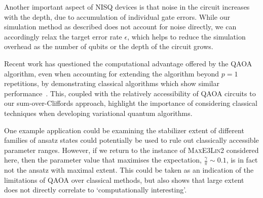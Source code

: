 Another important aspect of NISQ devices is that noise in the circuit increases with the depth, due to accumulation of individual gate errors. While our simulation method as described does not account for noise directly, we can accordingly relax the target error rate $\epsilon$, which helps to reduce the simulation overhead as the number of qubits or the depth of the circuit grows.\par
Recent work has questioned the computational advantage offered by the QAOA algorithm, even when accounting for extending the algorithm beyond $p=1$ repetitions, by demonstrating classical algorithms which show similar performance~\cite{Hastings2019}. This, coupled with the relatively accessibility of QAOA circuits to our sum-over-Cliffords approach, highlight the importance of considering classical techniques when developing variational quantum algorithms.\par
One example application could be examining the stabilizer extent of different families of ansatz states could potentially be used to rule out classically accessible parameter ranges. However, if we return to the instance of \textsc{MaxE3Lin2} considered here, then the parameter value that maximises the expectation, $\frac{\gamma}{\pi}\sim 0.1$, is in fact not the ansatz with maximal extent. This could be taken as an indication of the limitations of QAOA over classical methods, but also shows that large extent does not directly correlate to `computationally interesting'.
